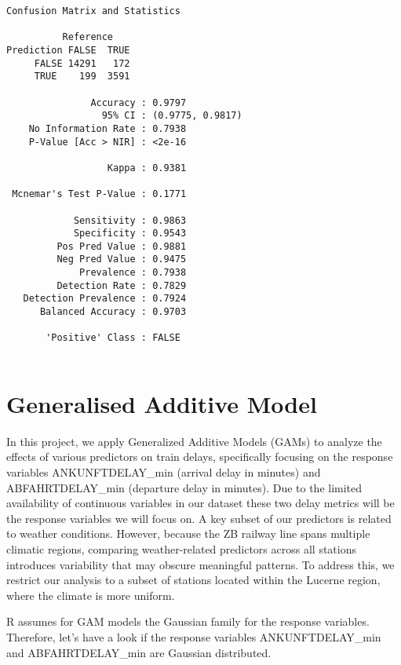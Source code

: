 \documentclass[
]{article}
\begin{document}
\begin{verbatim}
Confusion Matrix and Statistics

          Reference
Prediction FALSE  TRUE
     FALSE 14291   172
     TRUE    199  3591
                                          
               Accuracy : 0.9797          
                 95% CI : (0.9775, 0.9817)
    No Information Rate : 0.7938          
    P-Value [Acc > NIR] : <2e-16          
                                          
                  Kappa : 0.9381          
                                          
 Mcnemar's Test P-Value : 0.1771          
                                          
            Sensitivity : 0.9863          
            Specificity : 0.9543          
         Pos Pred Value : 0.9881          
         Neg Pred Value : 0.9475          
             Prevalence : 0.7938          
         Detection Rate : 0.7829          
   Detection Prevalence : 0.7924          
      Balanced Accuracy : 0.9703          
                                          
       'Positive' Class : FALSE           
                                          
\end{verbatim}

\section{Generalised Additive Model}\label{generalised-additive-model}

In this project, we apply Generalized Additive Models (GAMs) to analyze
the effects of various predictors on train delays, specifically focusing
on the response variables ANKUNFTDELAY\_min (arrival delay in minutes)
and ABFAHRTDELAY\_min (departure delay in minutes). Due to the limited
availability of continuous variables in our dataset these two delay
metrics will be the response variables we will focus on. A key subset of
our predictors is related to weather conditions. However, because the ZB
railway line spans multiple climatic regions, comparing weather-related
predictors across all stations introduces variability that may obscure
meaningful patterns. To address this, we restrict our analysis to a
subset of stations located within the Lucerne region, where the climate
is more uniform.

R assumes for GAM models the Gaussian family for the response variables.
Therefore, let's have a look if the response variables ANKUNFTDELAY\_min
and ABFAHRTDELAY\_min are Gaussian distributed.
\end{document}
